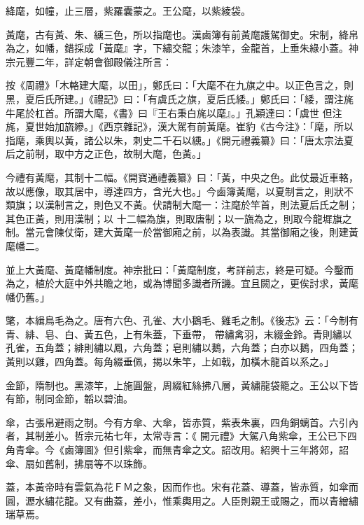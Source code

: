 \begin{pinyinscope}
 絳麾，如幢，止三層，紫羅囊蒙之。王公麾，以紫綾袋。



 黃麾，古有黃、朱、纁三色，所以指麾也。漢鹵簿有前黃麾護駕御史。宋制，絳帛為之，如幡，錯採成「黃麾』字，下繡交龍；朱漆竿，金龍首，上垂朱綠小蓋。神宗元豐二年，詳定朝會御殿儀注所言：



 按《周禮》「木輅建大麾，以田」，鄭氏曰：「大麾不在九旗之中。以正色言之，則黑，夏后氏所建。」《禮記》曰：「有虞氏之旗，夏后氏緌。」鄭氏曰：「緌，謂注旄牛尾於杠首。所謂大麾，《書》曰『王右秉白旄以麾』。」孔穎達曰：「虞世
 但注旄，夏世始加旒縿。」《西京雜記》，漢大駕有前黃麾。崔豹《古今注》：「麾，所以指麾，乘輿以黃，諸公以朱，刺史二千石以纁。」《開元禮義纂》曰：「唐太宗法夏后之前制，取中方之正色，故制大麾，色黃。」



 今禮有黃麾，其制十二幅。《開寶通禮義纂》曰：「黃，中央之色。此仗最近車輅，故以應像，取其居中，導達四方，含光大也。」今鹵簿黃麾，以夏制言之，則狀不類旗；以漢制言之，則色又不黃。伏請制大麾一：注麾於竿首，則法夏后氏之制；其色正黃，則用漢制；以
 十二幅為旗，則取唐制；以一旒為之，則取今龍墀旗之制。當元會陳仗衛，建大黃麾一於當御廂之前，以為表識。其當御廂之後，則建黃麾幡二。



 並上大黃麾、黃麾幡制度。神宗批曰：「黃麾制度，考詳前志，終是可疑。今鑿而為之，植於大庭中外共瞻之地，或為博聞多識者所譏。宜且闕之，更俟討求，黃麾幡仍舊。」



 氅，本緝鳥毛為之。唐有六色、孔雀、大小鵝毛、雞毛之制。《後志》云：「今制有青、緋、皂、白、黃五色，上有朱蓋，下垂帶，
 帶繡禽羽，末綴金鈴。青則繡以孔雀，五角蓋；緋則繡以鳳，六角蓋；皂則繡以鵝，六角蓋；白亦以鵝，四角蓋；黃則以雞，四角蓋。每角綴垂佩，揭以朱竿，上如戟，加橫木龍首以系之。」



 金節，隋制也。黑漆竿，上施圓盤，周綴紅絲拂八層，黃繡龍袋籠之。王公以下皆有節，制同金節，韜以碧油。



 傘，古張帛避雨之制。今有方傘、大傘，皆赤質，紫表朱裏，四角銅螭首。六引內者，其制差小。哲宗元祐七年，太常寺言：《
 開元禮》大駕八角紫傘，王公已下四角青傘。今《鹵簿圖》但引紫傘，而無青傘之文。詔改用。紹興十三年將郊，詔傘、扇如舊制，拂扇等不以珠飾。



 蓋，本黃帝時有雲氣為花ＦＭ之象，因而作也。宋有花蓋、導蓋，皆赤質，如傘而圓，瀝水繡花龍。又有曲蓋，差小，惟乘輿用之。人臣則親王或賜之，而以青繒繡瑞草焉。




\end{pinyinscope}

